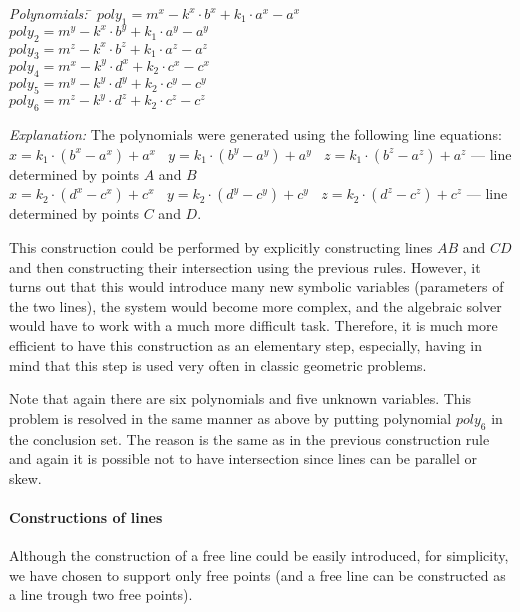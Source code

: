 \documentclass[final,1p,times,authoryear]{elsarticle}
\begin{document}
\begin{description}
\begin{tabbing}
{\em Polynomials:} \= $poly_1 = m^x - k^x\cdot b^x + k_1\cdot a^x - a^x$ \\
                   \> $poly_2 = m^y - k^x\cdot b^y + k_1\cdot a^y - a^y$ \\
                   \> $poly_3 = m^z - k^x\cdot b^z + k_1\cdot a^z - a^z$ \\
                   \> $poly_4 = m^x - k^y\cdot d^x + k_2\cdot c^x - c^x$ \\
                   \> $poly_5 = m^y - k^y\cdot d^y + k_2\cdot c^y - c^y$ \\
                   \> $poly_6 = m^z - k^y\cdot d^z + k_2\cdot c^z - c^z$
\end{tabbing}

{\em Explanation:} The polynomials were generated using the following
line equations: \\ $x = k_1\cdot (b^x - a^x) + a^x \ \ \ \ y =
k_1\cdot (b^y - a^y) + a^y \ \ \ \ z = k_1\cdot (b^z - a^z) + a^z$ ---
line determined by points $A$ and $B$ \\ $x = k_2\cdot (d^x - c^x) +
c^x \ \ \ \ y = k_2\cdot (d^y - c^y) + c^y \ \ \ \ z = k_2\cdot (d^z -
c^z) + c^z$ --- line determined by points $C$ and $D$.



This construction could be performed by explicitly constructing lines
$AB$ and $CD$ and then constructing their intersection using the
previous rules. However, it turns out that this would introduce many
new symbolic variables (parameters of the two lines), the system would
become more complex, and the algebraic solver would have to work with
a much more difficult task. Therefore, it is much more efficient to
have this construction as an elementary step, especially, having in
mind that this step is used very often in classic geometric problems. 

Note that again there are six polynomials and five unknown
variables. This problem is resolved in the same manner as above by
putting polynomial $poly_6$ in the conclusion set. The reason is the
same as in the previous construction rule and again it is possible not
to have intersection since lines can be parallel or skew.
\end{description}


\paragraph{Constructions of lines}
Although the construction of a free line could be easily introduced,
for simplicity, we have chosen to support only free points (and a free
line can be constructed as a line trough two free points).
\end{document}
